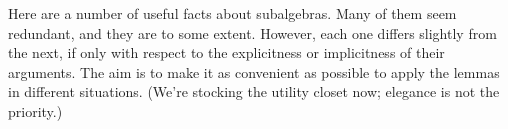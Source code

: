 Here are a number of useful facts about subalgebras. Many of them seem redundant, and they are to some extent. However, each one differs slightly from the next, if only with respect to the explicitness or implicitness of their arguments. The aim is to make it as convenient as possible to apply the lemmas in different situations. (We're stocking the \ualib utility closet now; elegance is not the priority.)
\ccpad
\begin{code}%
\>[0]\AgdaSpace{}%
\AgdaModule{\AgdaUnderscore{}}\AgdaSpace{}%
\AgdaSymbol{\{}\AgdaSpace{}%
\AgdaSpace{}%
\AgdaSpace{}%
\AgdaSymbol{:}\AgdaSpace{}%
\AgdaSymbol{\}}\AgdaSpace{}%
\<%
\\
%
\\[\AgdaEmptyExtraSkip]%
\>[0][@{}l@{\AgdaIndent{0}}]%
\>[1]\<%
\\
%
\>[1]\AgdaSpace{}%
\AgdaSymbol{:}\AgdaSpace{}%
\AgdaSymbol{(}\AgdaSpace{}%
\AgdaSymbol{:}\AgdaSpace{}%
\AgdaSpace{}%
\AgdaSpace{}%
\AgdaSymbol{)(}\AgdaSpace{}%
\AgdaSymbol{:}\AgdaSpace{}%
\AgdaSpace{}%
\AgdaSpace{}%
\AgdaSymbol{)(}\AgdaSpace{}%
\AgdaSymbol{:}\AgdaSpace{}%
\AgdaSpace{}%
\AgdaSpace{}%
\AgdaSymbol{)}\<%
\\
\>[1][@{}l@{\AgdaIndent{0}}]%
\>[2]%
\>[11]\AgdaSpace{}%
\AgdaSpace{}%
%
\>[18]%
\>[21]\AgdaSpace{}%
\AgdaSpace{}%
\<%
\\
%
\>[11]\AgdaComment{----------------}\<%
\\
%
\>[2]%
\>[11]\AgdaSpace{}%
\AgdaSpace{}%
\<%
\\
%
\\[\AgdaEmptyExtraSkip]%
%
\>[1]\AgdaSpace{}%
\AgdaSpace{}%
\AgdaSpace{}%
\AgdaSpace{}%
\AgdaSpace{}%
\AgdaSpace{}%
\AgdaSymbol{=}\AgdaSpace{}%
\AgdaSymbol{(}\AgdaSpace{}%
\AgdaSpace{}%
\AgdaSpace{}%
\AgdaSpace{}%
\AgdaSpace{}%
\AgdaSpace{}%

\end{code}
